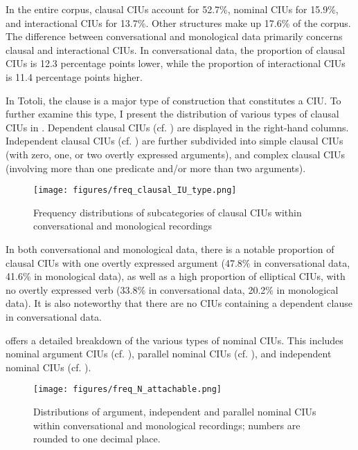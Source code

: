 In the entire corpus, clausal CIUs account for 52.7\%, nominal CIUs for 15.9\%, and interactional CIUs for 13.7\%. Other structures make up 17.6\% of the corpus. The difference between conversational and monological data primarily concerns clausal and interactional CIUs. In conversational data, the proportion of clausal CIUs is 12.3 percentage points lower, while the proportion of interactional CIUs is 11.4 percentage points higher.

In Totoli, the clause is a major type of construction that constitutes a CIU. To further examine this type, I present the distribution of various types of clausal CIUs in  . Dependent clausal CIUs (cf. ) are displayed in the right-hand columns. Independent clausal CIUs (cf.  ) are further subdivided into simple clausal CIUs (with zero, one, or two overtly expressed arguments), and complex clausal CIUs (involving more than one predicate and/or more than two arguments).




\begin{figure}
	\texttt{[image: figures/freq\_clausal\_IU\_type.png]}
	\caption{Frequency distributions of subcategories of clausal CIUs within conversational and monological recordings}
	\label{freq_clausal_IU_type}
\end{figure}

In both conversational and monological data, there is a notable proportion of clausal CIUs with one overtly expressed argument (47.8\% in conversational data, 41.6\% in monological data), as well as a high proportion of elliptical CIUs, with no overtly expressed verb (33.8\% in conversational data, 20.2\% in monological data). It is also noteworthy that there are no CIUs containing a dependent clause in conversational data.

 offers a detailed breakdown of the various types of nominal CIUs. This includes nominal argument CIUs (cf.  ), parallel nominal CIUs (cf.  ), and independent nominal CIUs (cf.  ).


\begin{figure}
	\texttt{[image: figures/freq\_N\_attachable.png]}
	\caption{Distributions of argument, independent and parallel nominal CIUs within conversational and monological recordings; numbers are rounded to one decimal place.}
	\label{freq_N_attachable}
\end{figure}


